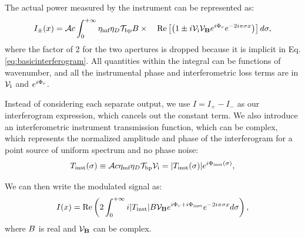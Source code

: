 
The actual power measured by the instrument can be represented as:
\begin{equation}
I_\pm(x) = \mathcal{A} c\int_0^{+\infty} \eta_\textrm{mf}\eta_D\mathcal{T}_\textrm{bp} B \times
 \quad  \textrm{Re} \left[\left(1\pm i \mathcal{V}_\textrm{i}\mathcal{V}_{\mathbf{B}} e^{i\Phi_r} e^{-2i\pi \sigma x}\right) \right]d\sigma,
\end{equation}
where the factor of 2 for the two apertures is dropped because it is implicit in Eq. \ref{eq:basicinterferogram}. All quantities within the integral can be functions of wavenumber, and all the instrumental phase and interferometric loss terms are in $\mathcal{V}_\textrm{i}$ and $e^{i\Phi_r}$.

Instead of considering each separate output, we use $I = I_+ - I_-$ as our interferogram expression, which cancels out the constant term. We also introduce an interferometric instrument transmission function, which can be complex, which represents the normalized amplitude and phase of the interferogram for a point source of uniform spectrum and no phase noise:
\begin{equation}
T_{\textrm{inst}}(\sigma) \equiv \mathcal{A} c\eta_\textrm{mf}\eta_D\mathcal{T}_\textrm{bp} \mathcal{V}_\textrm{i} = |T_{\textrm{inst}}(\sigma)|e^{i\Phi_{\textrm{inst}}(\sigma)},
\end{equation}

 We can then write the modulated signal as:
\begin{equation}
I(x) = \textrm{Re}\left( 2\int_{0}^{+\infty} i |T_{\textrm{inst}}| B \mathcal{V}_{\mathbf{B}} e^{i\Phi_r + i\Phi_{\textrm{inst}}} e^{-2i\pi \sigma x}d\sigma \right),
\label{eq:modsignal}
\end{equation}
where $B$ is real and $\mathcal{V}_{\mathbf{B}}$ can be complex.

